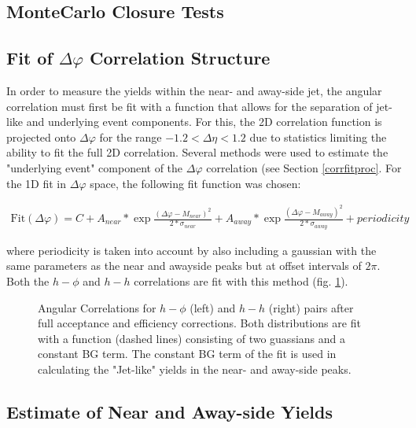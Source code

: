 \documentclass[ALICE,manyauthors]{ALICE_analysis_notes}
\begin{document}
\subsection{MonteCarlo Closure Tests}


\subsection{Fit of $\Delta \varphi$ Correlation Structure}

In order to measure the yields within the near- and away-side jet, the angular correlation must first be fit with a function that allows for the separation of jet-like and underlying event components.  For this, the 2D correlation function is projected onto $\Delta\varphi$ for the range $-1.2 < \Delta\eta < 1.2$ due to statistics limiting the ability to fit the full 2D correlation. Several methods were used to estimate the "underlying event" component of the $\Delta\varphi$ correlation (see Section \ref{corrfitproc}. For the 1D fit in $\Delta\varphi$ space, the following fit function was chosen:

\begin{align}
	\text{Fit}(\Delta\varphi) = C + A_{near}*\exp{\frac{(\Delta\varphi - M_{near})^2}{2*\sigma_{near}}} + A_{away}*\exp{\frac{(\Delta\varphi - M_{away})^2}{2*\sigma_{away}}} + \textit{periodicity}
\end{align}

where periodicity is taken into account by also including a gaussian with the same parameters as the near and awayside peaks but at offset intervals of $2\pi$. Both the $h-\phi$ and $h-h$ correlations are fit with this method (fig. \ref{dphi}).
\begin{figure}[ht]
\begin{subfigure}{
\texttt{[image: images/dphi\_hPhi\_0\_20.pdf]}}
\end{subfigure}
\begin{subfigure}{
\texttt{[image: images/dphi\_hh\_0\_20.pdf]}}
\end{subfigure}
\caption{Angular Correlations for $h-\phi$ (left) and $h-h$ (right) pairs after full acceptance and efficiency corrections.  Both distributions are fit with a function (dashed lines) consisting of two guassians and a constant BG term. The constant BG term of the fit is used in calculating the "Jet-like" yields in the near- and away-side peaks.}
\label{dphi}
\end{figure}
\subsection{Estimate of Near and Away-side Yields}
\end{document}
